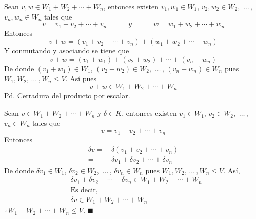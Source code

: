 \documentclass[fleqn]{article}
\begin{document}
\begin{enumerate}
\begin{enumerate}
            Sean $ v, w \in W_1 + W_2 + \cdots + W_n $, entonces existen $ v_1, w_1 \in W_1 $, $ v_2, w_2 \in W_2 $, $ \, \ldots \, $, $ v_n, w_n \in W_n $ tales que
            \begin{equation*}
                v = v_1 + v_2 + \cdots + v_n \quad \quad \quad y \quad \quad \quad
                w = w_1 + w_2 + \cdots + w_n
            \end{equation*}
            Entonces
            \begin{equation*}
                v + w = \left( v_1 + v_2 + \cdots + v_n \right) + \left( w_1 + w_2 + \cdots + w_n \right)
            \end{equation*}
            Y conmutando y asociando se tiene que 
            \begin{equation*}
                v + w = \left( v_1 + w_1 \right) + \left( v_2 + w_2 \right) + \cdots + \left( v_n + w_n \right)
            \end{equation*}
            De donde $ \left( v_1 + w_1 \right) \in W_1 $, $ \left( v_2 + w_2 \right) \in W_2 $, $ \, \ldots \, $, $ \left( v_n + w_n \right) \in W_n $ pues $ W_1, W_2, \, \ldots \, , W_n \leq V $. Así pues
            \begin{equation*}
                v + w \in W_1 + W_2 + \cdots + W_n
            \end{equation*}
            Pd. Cerradura del producto por escalar. \par
            Sean $ v \in W_1 + W_2 + \cdots + W_n $ y $ \delta \in K $, entonces existen $ v_1 \in W_1 $, $ v_2 \in W_2 $, $ \, \ldots \, $, $ v_n \in W_n $ tales que
            \begin{equation*}
                v = v_1 + v_2 + \cdots + v_n
            \end{equation*}
            Entonces
            \begin{align*}
                \delta v =& \, \delta \left( v_1 + v_2 + \cdots + v_n \right) \\
                =& \, \delta v_1 + \delta v_2 + \cdots + \delta v_n 
            \end{align*}
            De donde $ \delta v_1 \in W_1 $, $ \delta v_2 \in W_2 $, $ \, \ldots \, $, $ \delta v_n \in W_n $ pues $ W_1, W_2, \, \ldots \, , W_n \leq V $. Así,
            \begin{align*}
                & \delta v_1 + \delta v_2 + \cdots + \delta v_n \in W_1 + W_2 + \cdots + W_n \\
                & \text{Es decir,} \\
                & \delta v \in W_1 + W_2 + \cdots + W_n
            \end{align*}
            $ \therefore W_1 + W_2 + \cdots + W_n \leq V $. $\blacksquare$


\end{enumerate}
\end{enumerate}
\end{document}
